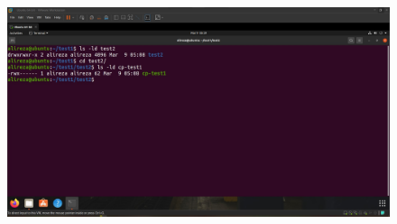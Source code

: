 \documentclass{article}
\begin{document}
\subsection{}
\begin{figure}[H]
    \centering
    \includegraphics[width=1.0\textwidth]{figures/5c.jpg}
    \caption
	{
	}
    \label{fig:fig1}
\end{figure}
\end{document}
